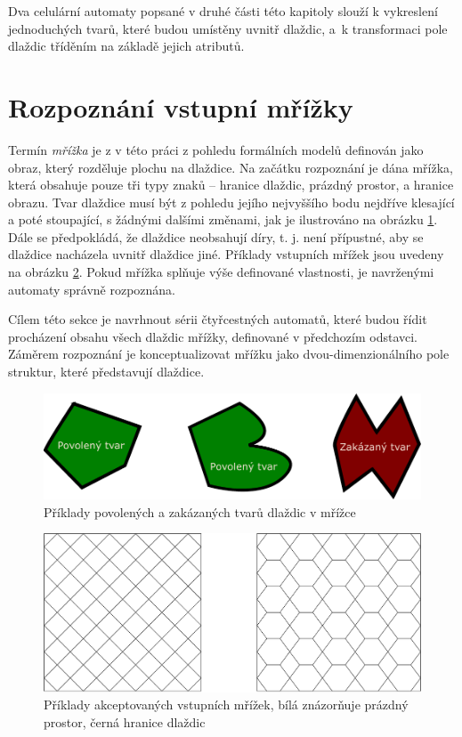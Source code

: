 Dva celulární automaty popsané v druhé části této kapitoly slouží k vykreslení jednoduchých tvarů, které budou umístěny uvnitř dlaždic, a~k transformaci pole dlaždic tříděním na základě jejich atributů.


\section{Rozpoznání vstupní mřížky}
\label{section:recogTheory}
Termín \emph{mřížka} je z v této práci z pohledu formálních modelů definován jako obraz, který rozděluje plochu na dlaždice.
Na začátku rozpoznání je dána mřížka, která obsahuje pouze tři typy znaků -- hranice dlaždic, prázdný prostor, a hranice obrazu.
Tvar dlaždice musí být z pohledu jejího nejvyššího bodu nejdříve klesající a poté stoupající, s žádnými dalšími změnami, jak je ilustrováno na obrázku \ref{fig:TvaryDlazdic}. Dále se předpokládá, že dlaždice neobsahují díry, t. j. není přípustné, aby se dlaždice nacházela uvnitř dlaždice jiné. Příklady vstupních mřížek jsou uvedeny na obrázku \ref{fig:MrizkaPriklad}. Pokud mřížka splňuje výše definované vlastnosti, je navrženými automaty správně rozpoznána.

Cílem této sekce je navrhnout sérii čtyřcestných automatů, které budou řídit procházení obsahu všech dlaždic mřížky, definované v předchozím odstavci. Záměrem rozpoznání je konceptualizovat mřížku jako dvou-dimenzionálního pole struktur, které představují dlaždice.
\begin{figure}[H]
    \centering
    \includegraphics[width=\textwidth]{obrazky-figures/tvaryDlazdic.pdf}
    \caption{Příklady povolených a zakázaných tvarů dlaždic v mřížce}
    \label{fig:TvaryDlazdic}
\end{figure}

\begin{figure}[H]
    \centering
    \includegraphics[width=\textwidth]{obrazky-figures/MrizkaPriklad.pdf}
    \caption{Příklady akceptovaných vstupních mřížek, bílá znázorňuje prázdný prostor, černá hranice dlaždic}
    \label{fig:MrizkaPriklad}
\end{figure}

